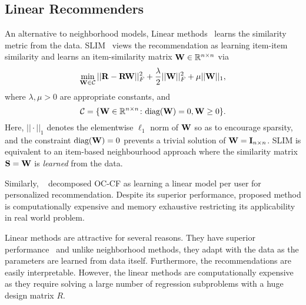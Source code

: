\subsection{Linear Recommenders}

An alternative to neighborhood models, Linear methods~\cite{Ning:2011, Sedhain:2016} learns the similarity metric from the data. SLIM~\citep{Ning:2011} views the recommendation as learning item-item similarity and learns an item-similarity matrix $\mathbf{W} \in \mathbb{R}^{n \times n}$ via
\begin{equation}
\label{eqn:slim}
\min_{ \mathbf{W} \in \mathcal{C} } || \mathbf{R} - \mathbf{R} \mathbf{W} ||_F^2 + \frac{\lambda}{2} || \mathbf{W} ||_F^2 + \mu || \mathbf{W} ||_1,
\end{equation}
where $\lambda, \mu > 0$ are appropriate constants, and
\begin{equation}
\label{eqn:slim-constraint}
\mathcal{C} = \{ \mathbf{W} \in \mathbb{R}^{n \times n} \colon \text{diag}( \mathbf{W} ) = 0, \mathbf{W} \geq 0 \}.
\end{equation}
Here, $|| \cdot ||_1$ denotes the elementwise $\ell_1$ norm of $\mathbf{W}$ so as to encourage sparsity, and the constraint $\text{diag}( \mathbf{W} ) = 0$ prevents a trivial solution of $\mathbf{W} = \mathbf{I}_{n \times n}$. SLIM is equivalent to an item-based neighbourhood approach where the similarity matrix $\mathbf{S} = \mathbf{W}$ is \emph{learned} from the data.

Similarly, ~\citep{Sedhain:2016} decomposed OC-CF as learning a linear model per user for personalized recommendation. Despite its superior performance, proposed method is computationally expensive and memory exhaustive restricting its applicability in real world problem.

Linear methods are attractive for several reasons. They have superior performance~\cite{Ning:2011, Sedhain:2016} and unlike neighborhood methods, they adapt with the data as the parameters are learned from data itself. Furthermore, the recommendations are easily interpretable. However, the linear methods are computationally expensive as they require solving a large number of regression subproblems with a huge design matrix $R$. 

